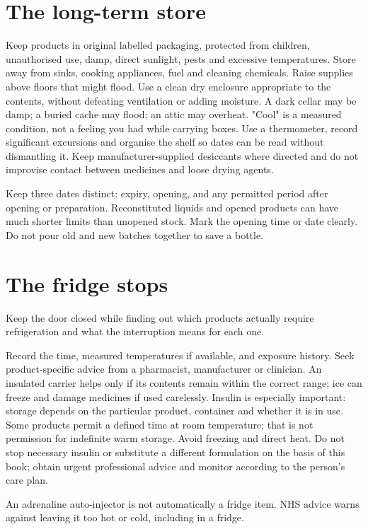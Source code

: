 \documentclass[10pt,openright]{book}
\begin{document}
\section*{The long-term store}
Keep products in original labelled packaging, protected from children, unauthorised use, damp, direct sunlight, pests and excessive temperatures. Store away from sinks, cooking appliances, fuel and cleaning chemicals. Raise supplies above floors that might flood. Use a clean dry enclosure appropriate to the contents, without defeating ventilation or adding moisture. A dark cellar may be damp; a buried cache may flood; an attic may overheat. "Cool" is a measured condition, not a feeling you had while carrying boxes. Use a thermometer, record significant excursions and organise the shelf so dates can be read without dismantling it. Keep manufacturer-supplied desiccants where directed and do not improvise contact between medicines and loose drying agents.

Keep three dates distinct: expiry, opening, and any permitted period after opening or preparation. Reconstituted liquids and opened products can have much shorter limits than unopened stock. Mark the opening time or date clearly. Do not pour old and new batches together to save a bottle.

\section*{The fridge stops}
Keep the door closed while finding out which products actually require refrigeration and what the interruption means for each one.

Record the time, measured temperatures if available, and exposure history. Seek product-specific advice from a pharmacist, manufacturer or clinician. An insulated carrier helps only if its contents remain within the correct range; ice can freeze and damage medicines if used carelessly. Insulin is especially important: storage depends on the particular product, container and whether it is in use. Some products permit a defined time at room temperature; that is not permission for indefinite warm storage. Avoid freezing and direct heat. Do not stop necessary insulin or substitute a different formulation on the basis of this book; obtain urgent professional advice and monitor according to the person's care plan.

An adrenaline auto-injector is not automatically a fridge item. NHS advice warns against leaving it too hot or cold, including in a fridge.
\end{document}

